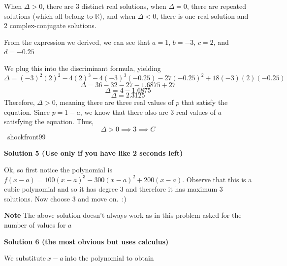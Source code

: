 \begin{enumerate}
 When $\Delta > 0$, there are $3$ distinct real solutions, when $\Delta =0$, there are repeated solutions (which all belong to $\mathbb{R}$), and when $\Delta<0$, there is one real solution and 2 complex-conjugate solutions.

 From the expression we derived, we can see that $a=1$, $b=-3$, $c=2$, and $d=-0.25$

 


 We plug this into the discriminant formula, yielding
 \[\Delta=(-3)^2(2)^2-4(2)^3-4(-3)^3(-0.25)-27(-0.25)^2+18(-3)(2)(-0.25)\]
 \[\Delta=36-32-27-1.6875+27\]
 \[\Delta=4-1.6875\]
 \[\Delta=2.3125\]Therefore, $\Delta>0$, meaning there are three real values of $p$ that satisfy the equation. Since $p=1-a$, we know that there also are 3 real values of $a$ satisfying the equation. Thus,
 \[\Delta > 0 \implies 3 \implies \boxed{C}\]~shockfront99

 



\textbf{Solution 5 (Use only if you have like 2 seconds left)}

Ok, so first notice the polynomial is $f(x - a) = 100(x - a)^3 - 300(x - a)^2 + 200(x - a)$. Observe that this is a cubic polynomial and so it has degree $3$ and therefore it has maximum $3$ solutions. Now choose $3$ and move on. :)

 


 \textbf{Note} The above solution doesn't always work as in this problem asked for the number of values for $a$




\textbf{Solution 6 (the most obvious but uses calculus)}

We substitute$\: x-a \:$into the polynomial to obtain


\end{enumerate}
